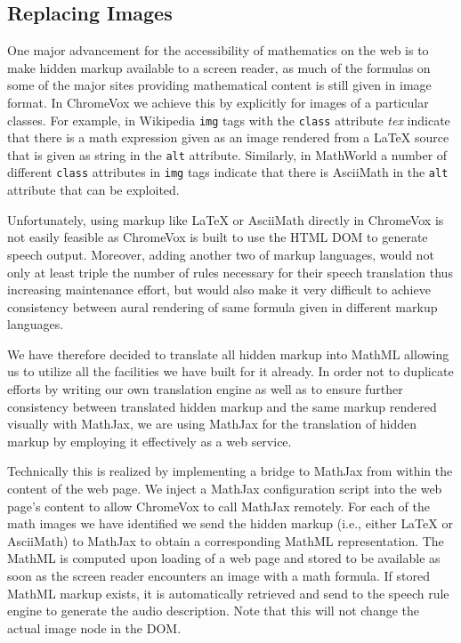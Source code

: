 \documentclass{sig-alternate}
\begin{document}
\subsection{Replacing Images}
\label{sec:images}

One major advancement for the accessibility of mathematics on the web is to make
hidden markup available to a screen reader, as much of the formulas on some of
the major sites providing mathematical content is still given in image format.
In ChromeVox we achieve this by explicitly for images of a particular classes.
For example, in Wikipedia \texttt{img} tags with the \texttt{class} attribute
\emph{tex} indicate that there is a math expression given as an image rendered
from a {\LaTeX} source that is given as string in the \texttt{alt} attribute.
Similarly, in MathWorld a number of different \texttt{class} attributes in
\texttt{img} tags indicate that there is AsciiMath in the \texttt{alt} attribute
that can be exploited.

Unfortunately, using markup like {\LaTeX} or AsciiMath directly in ChromeVox is
not easily feasible as ChromeVox is built to use the HTML DOM to generate speech
output. Moreover, adding another two of markup languages, would not only at
least triple the number of rules necessary for their speech translation thus
increasing maintenance effort, but would also make it very difficult to achieve
consistency between aural rendering of same formula given in different markup
languages.

We have therefore decided to translate all hidden markup into MathML allowing us
to utilize all the facilities we have built for it already. In order not to
duplicate efforts by writing our own translation engine as well as to ensure
further consistency between translated hidden markup and the same markup
rendered visually with MathJax, we are using MathJax for the translation of
hidden markup by employing it effectively as a web service.

Technically this is realized by implementing a bridge to MathJax from within the
content of the web page. We inject a MathJax configuration script into the
web page's content to allow ChromeVox to call MathJax remotely. For each of the
math images we have identified we send the hidden markup (i.e., either {\LaTeX}
or AsciiMath) to MathJax to obtain a corresponding MathML representation. The
MathML is computed upon loading of a web page and stored to be available as soon
as the screen reader encounters an image with a math formula. If stored MathML
markup exists, it is automatically retrieved and send to the speech rule engine
to generate the audio description. Note that this will not change the actual
image node in the DOM.
\end{document}
